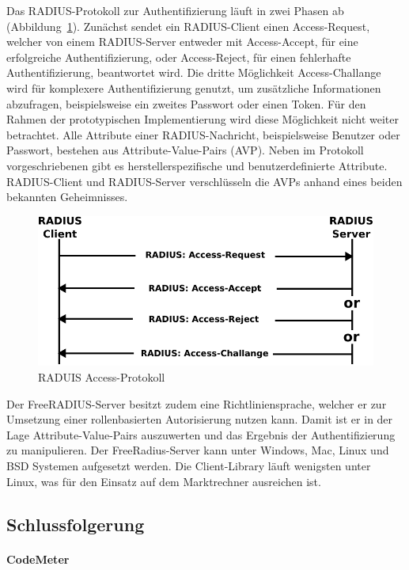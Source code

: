 \documentclass[11pt,a4paper]{report}
\begin{document}
Das RADIUS-Protokoll zur Authentifizierung läuft in zwei Phasen ab (Abbildung~\ref{fig:radius_access}). Zunächst sendet ein RADIUS-Client einen Access-Request, welcher von einem RADIUS-Server entweder mit Access-Accept, für eine erfolgreiche Authentifizierung, oder Access-Reject, für einen fehlerhafte Authentifizierung, beantwortet wird. Die dritte Möglichkeit Access-Challange wird für komplexere Authentifizierung genutzt, um zusätzliche Informationen abzufragen, beispielsweise ein zweites Passwort oder einen Token. Für den Rahmen der prototypischen Implementierung wird diese Möglichkeit nicht weiter betrachtet. Alle Attribute einer RADIUS-Nachricht, beispielsweise Benutzer oder Passwort, bestehen aus Attribute-Value-Pairs (AVP). Neben im Protokoll vorgeschriebenen gibt es herstellerspezifische und benutzerdefinierte Attribute. RADIUS-Client und RADIUS-Server verschlüsseln die AVPs anhand eines beiden bekannten Geheimnisses.

\begin{figure}[htbp]
\centering
\includegraphics[scale=0.8]{images/RADIUS_access.pdf}
\caption{RADUIS Access-Protokoll}
\label{fig:radius_access}
\end{figure}

Der FreeRADIUS-Server besitzt zudem eine Richtliniensprache, welcher er zur Umsetzung einer rollenbasierten Autorisierung nutzen kann. Damit ist er in der Lage Attribute-Value-Pairs auszuwerten und das Ergebnis der Authentifizierung zu manipulieren. Der FreeRadius-Server kann unter Windows, Mac, Linux und BSD Systemen aufgesetzt werden. Die Client-Library läuft wenigsten unter Linux, was für den Einsatz auf dem Marktrechner ausreichen ist.

\subsection{Schlussfolgerung}

\paragraph{CodeMeter}
\end{document}
